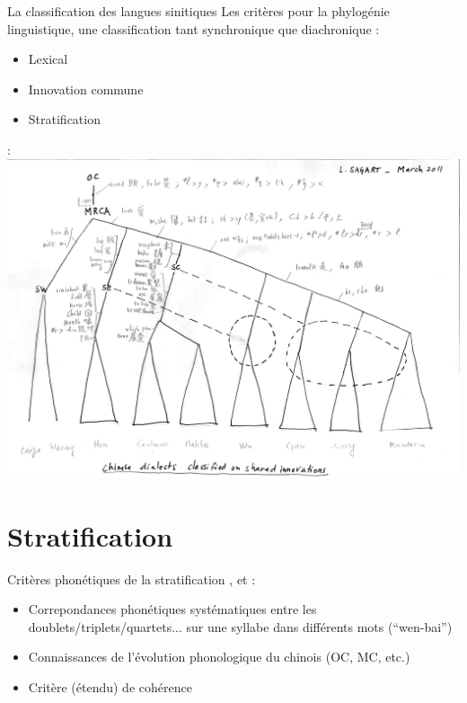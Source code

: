 \documentclass[11pt]{beamer}
\begin{document}
\begin{frame}{La classification des langues sinitiques}
Les critères pour la phylogénie linguistique, une classification tant synchronique que diachronique :
\begin{itemize}
\item{Lexical}

\item{Innovation commune}

\item{Stratification}
\end{itemize}
\end{frame}

\begin{frame}
\textcite{sagart2011classifying} :
\includegraphics[scale=.25]{sagart}
\end{frame}

\section{Stratification}
\begin{frame}{Critères phonétiques de la stratification}
\textcite{Sagart2001hani}, \textcite{Chen2003yu} et \textcite{Chen2005couche} :
\begin{itemize}
\item{Correpondances phonétiques systématiques entre les doublets/triplets/quartets... sur une syllabe dans différents mots (``wen-bai'')}

\item{Connaissances de l'évolution phonologique du chinois (OC, MC, etc.)}

\item{Critère (étendu) de cohérence}
\end{itemize} 
\end{frame}
 
\end{document}
